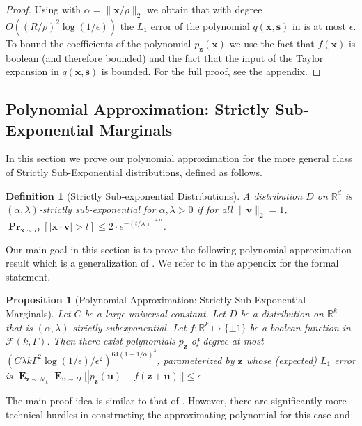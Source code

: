 \documentclass[10pt,a4paper]{article}
\newtheorem{proposition}{Proposition}[section]
\newtheorem{definition}{Definition}[section]
\newcommand\twonorm[1]{\|#1\|_2}
\renewcommand\vec[1]{\mathbf{#1}}
\DeclareMathOperator*{\pr}{\mathbf{Pr}}
\DeclareMathOperator*{\E}{\mathbf{E}}
\newcommand{\R}{\mathbb{R}}
\newcommand{\eps}{\epsilon}
\newcommand{\1}{\Ind}
\newcommand{\x}{\vec x}
\newcommand{\vv}{\vec v}
\newcommand{\vu}{\vec u}
\newcommand{\z}{\vec z}
\newcommand{\Gauss}{\mathcal{N}}
\begin{document}
\begin{proof}
Using  with $\alpha=\twonorm{\x/\rho}$ we obtain that 
with degree $O((R/\rho)^2 \log(1/\eps))$ the $L_1$ error of the polynomial $q(\x, \vec s)$ in  is at most $\eps$.   To bound the coefficients of the polynomial $p_\vec z(\x)$ we use the fact that $f(\x)$ is boolean (and therefore bounded) and the fact that the input of the Taylor expansion in $q(\x, \vec s)$ is bounded.
For 
the full proof, see the appendix.%
\end{proof}


\subsection{Polynomial Approximation: Strictly Sub-Exponential Marginals}
\label{sec:polynomial-sub-exp}
In this section we prove our polynomial approximation for the more general class of Strictly Sub-Exponential
distributions, defined as follows.
\begin{definition}[Strictly Sub-exponential Distributions]
    \label{def:strict_subexp}
    A distribution $D$ on $\R^d$ is $(\alpha,\lambda)$-strictly sub-exponential for $\alpha,\lambda>0$ 
    if for all $\twonorm{\vv}=1$, 
        \(
          \pr_{\x\sim D}[|\x\cdot \vv|>t ]\leq 2\cdot e^{-(t/\lambda)^{1+\alpha}} 
        \).
\end{definition}
Our main goal in this section is to prove the following polynomial approximation result which is a generalization of . We refer to  
in the appendix for the formal statement.
\begin{proposition}[Polynomial Approximation: Strictly Sub-Exponential Marginals]
    \label{lem:poly_approx_boolean_subexp_main_body}
    Let $C$ be a large universal constant.
    Let $D$ be a distribution on $\R^k$ that is $(\alpha,\lambda)$-strictly subexponential. Let 
    $f:\R^k \mapsto \{\pm 1\}$ be a boolean function in $\mathcal{F}(k, \Gamma)$.
    Then there exist polynomials $p_{\z}$ of degree at most 
     $\left(C \lambda k\Gamma^2\log (1/\epsilon)/\epsilon^2\right)^{64(1+1/\alpha)^3}$,
    parameterized by $\z$ whose (expected) $L_1$ error is $\E_{\z\sim \Gauss_k}\E_{\vu\sim D}\bigl[|p_{\z}(\vu)-f(\z+\vu)|\bigr] \leq \epsilon$.
\end{proposition}
The main proof idea is similar to that of .   However, there are significantly more technical hurdles in constructing the approximating polynomial for this case and
\end{document}
